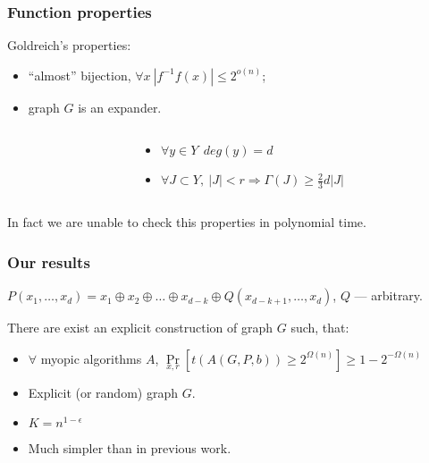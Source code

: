 \begin{frame}
    \frametitle{Function properties}

    \pause
    Goldreich's properties:
    \pause
    \begin{itemize}
	    \item ``almost'' bijection, $\forall x ~ |f^{-1}f(x)| \le 2^{o(n)}$;
    	\pause
        \item graph $G$ is an expander.
    \end{itemize}

    \pause

    \begin{columns}
        \begin{column}{5cm}
            
        \end{column}

        \pause
        \pause
        \pause
        \begin{column}{5cm}
            \begin{itemize}
                \item $\forall y \in Y ~~ deg(y) = d$
            	\pause
	            \item $\forall J \subset Y, ~
            		|J| < r \Rightarrow \Gamma(J) \ge \frac{2}{3}d|J|$
            \end{itemize}
		\end{column}
    \end{columns}

    \pause
    In fact we are unable to check this properties in polynomial time.

\end{frame}

\begin{frame}
	\frametitle{Our results}

	$P(x_1, \ldots, x_d) = x_1 \oplus x_2 \oplus \ldots \oplus x_{d - k} \oplus 
	Q(x_{d - k + 1}, \ldots, x_d)$, $Q$ --- arbitrary.

	\pause
	\begin{theorem}
		There are exist an explicit construction of graph $G$ such, that:
		\begin{itemize}
			\item $\forall$ myopic algorithms $A$,
        		 $\Pr\limits_{x, r}[t(A(G, P, b)) \ge 2^{\Omega(n)}] \ge 1 - 2^{-\Omega(n)}$
		\end{itemize}
	\end{theorem}

    \pause
    \begin{itemize}
	    \item Explicit (or random) graph $G$.
    	\pause
    	\item $K = n^{1 - \epsilon}$
    	\pause
    	\item Much simpler than in previous work.
    \end{itemize}
\end{frame}

